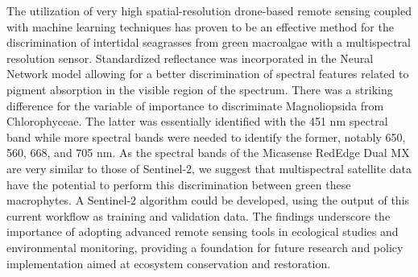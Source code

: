 \documentclass[
  number]{elsarticle}
\begin{document}
The utilization of very high spatial-resolution drone-based remote
sensing coupled with machine learning techniques has proven to be an
effective method for the discrimination of intertidal seagrasses from
green macroalgae with a multispectral resolution sensor. Standardized
reflectance was incorporated in the Neural Network model allowing for a
better discrimination of spectral features related to pigment absorption
in the visible region of the spectrum. There was a striking difference
for the variable of importance to discriminate Magnoliopsida from
Chlorophyceae. The latter was essentially identified with the 451 nm
spectral band while more spectral bands were needed to identify the
former, notably 650, 560, 668, and 705 nm. As the spectral bands of the
Micasense RedEdge Dual MX are very similar to those of Sentinel-2, we
suggest that multispectral satellite data have the potential to perform
this discrimination between green these macrophytes. A Sentinel-2
algorithm could be developed, using the output of this current workflow
as training and validation data. The findings underscore the importance
of adopting advanced remote sensing tools in ecological studies and
environmental monitoring, providing a foundation for future research and
policy implementation aimed at ecosystem conservation and restoration.


  
\end{document}
